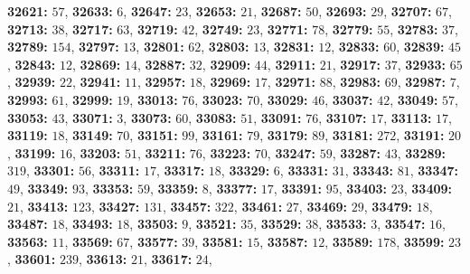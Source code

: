 \textsf{\bfseries 32621:} $57$, \textsf{\bfseries 32633:} $6$, \textsf{\bfseries 32647:} $23$, \textsf{\bfseries 32653:} $21$, \textsf{\bfseries 32687:} $50$, \textsf{\bfseries 32693:} $29$, \textsf{\bfseries 32707:} $67$, \textsf{\bfseries 32713:} $38$, \textsf{\bfseries 32717:} $63$, \textsf{\bfseries 32719:} $42$, \textsf{\bfseries 32749:} $23$, \textsf{\bfseries 32771:} $78$, \textsf{\bfseries 32779:} $55$, \textsf{\bfseries 32783:} $37$, \textsf{\bfseries 32789:} $154$, \textsf{\bfseries 32797:} $13$, \textsf{\bfseries 32801:} $62$, \textsf{\bfseries 32803:} $13$, \textsf{\bfseries 32831:} $12$, \textsf{\bfseries 32833:} $60$, \textsf{\bfseries 32839:} $45$, \textsf{\bfseries 32843:} $12$, \textsf{\bfseries 32869:} $14$, \textsf{\bfseries 32887:} $32$, \textsf{\bfseries 32909:} $44$, \textsf{\bfseries 32911:} $21$, \textsf{\bfseries 32917:} $37$, \textsf{\bfseries 32933:} $65$, \textsf{\bfseries 32939:} $22$, \textsf{\bfseries 32941:} $11$, \textsf{\bfseries 32957:} $18$, \textsf{\bfseries 32969:} $17$, \textsf{\bfseries 32971:} $88$, \textsf{\bfseries 32983:} $69$, \textsf{\bfseries 32987:} $7$, \textsf{\bfseries 32993:} $61$, \textsf{\bfseries 32999:} $19$, \textsf{\bfseries 33013:} $76$, \textsf{\bfseries 33023:} $70$, \textsf{\bfseries 33029:} $46$, \textsf{\bfseries 33037:} $42$, \textsf{\bfseries 33049:} $57$, \textsf{\bfseries 33053:} $43$, \textsf{\bfseries 33071:} $3$, \textsf{\bfseries 33073:} $60$, \textsf{\bfseries 33083:} $51$, \textsf{\bfseries 33091:} $76$, \textsf{\bfseries 33107:} $17$, \textsf{\bfseries 33113:} $17$, \textsf{\bfseries 33119:} $18$, \textsf{\bfseries 33149:} $70$, \textsf{\bfseries 33151:} $99$, \textsf{\bfseries 33161:} $79$, \textsf{\bfseries 33179:} $89$, \textsf{\bfseries 33181:} $272$, \textsf{\bfseries 33191:} $20$, \textsf{\bfseries 33199:} $16$, \textsf{\bfseries 33203:} $51$, \textsf{\bfseries 33211:} $76$, \textsf{\bfseries 33223:} $70$, \textsf{\bfseries 33247:} $59$, \textsf{\bfseries 33287:} $43$, \textsf{\bfseries 33289:} $319$, \textsf{\bfseries 33301:} $56$, \textsf{\bfseries 33311:} $17$, \textsf{\bfseries 33317:} $18$, \textsf{\bfseries 33329:} $6$, \textsf{\bfseries 33331:} $31$, \textsf{\bfseries 33343:} $81$, \textsf{\bfseries 33347:} $49$, \textsf{\bfseries 33349:} $93$, \textsf{\bfseries 33353:} $59$, \textsf{\bfseries 33359:} $8$, \textsf{\bfseries 33377:} $17$, \textsf{\bfseries 33391:} $95$, \textsf{\bfseries 33403:} $23$, \textsf{\bfseries 33409:} $21$, \textsf{\bfseries 33413:} $123$, \textsf{\bfseries 33427:} $131$, \textsf{\bfseries 33457:} $322$, \textsf{\bfseries 33461:} $27$, \textsf{\bfseries 33469:} $29$, \textsf{\bfseries 33479:} $18$, \textsf{\bfseries 33487:} $18$, \textsf{\bfseries 33493:} $18$, \textsf{\bfseries 33503:} $9$, \textsf{\bfseries 33521:} $35$, \textsf{\bfseries 33529:} $38$, \textsf{\bfseries 33533:} $3$, \textsf{\bfseries 33547:} $16$, \textsf{\bfseries 33563:} $11$, \textsf{\bfseries 33569:} $67$, \textsf{\bfseries 33577:} $39$, \textsf{\bfseries 33581:} $15$, \textsf{\bfseries 33587:} $12$, \textsf{\bfseries 33589:} $178$, \textsf{\bfseries 33599:} $23$, \textsf{\bfseries 33601:} $239$, \textsf{\bfseries 33613:} $21$, \textsf{\bfseries 33617:} $24$, 
